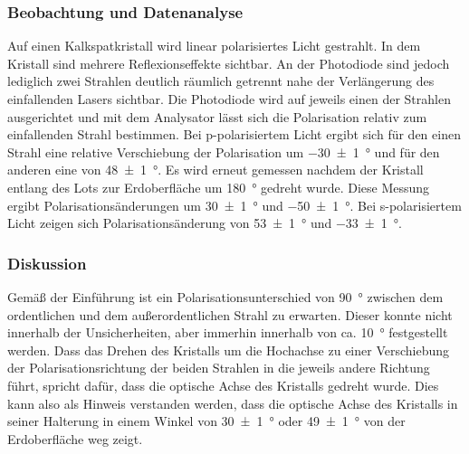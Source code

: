 \documentclass[
	a4paper,
	12pt,
	pagesize,
	ngerman
]{scrartcl}
\begin{document}
	\subsubsection{Beobachtung und Datenanalyse}
	Auf einen Kalkspatkristall wird linear polarisiertes Licht gestrahlt.
	In dem Kristall sind mehrere Reflexionseffekte sichtbar. 
	An der Photodiode sind jedoch lediglich zwei Strahlen deutlich räumlich getrennt nahe der Verlängerung des einfallenden Lasers sichtbar.
	Die Photodiode wird auf jeweils einen der Strahlen ausgerichtet und mit dem Analysator lässt sich die Polarisation relativ zum einfallenden Strahl bestimmen.
	Bei p-polarisiertem Licht ergibt sich für den einen Strahl eine relative Verschiebung der Polarisation um \SI{-30+-1}{\degree} und für den anderen eine von \SI{48+-1}{\degree}.
	Es wird erneut gemessen nachdem der Kristall entlang des Lots zur Erdoberfläche um \SI{180}{\degree} gedreht wurde.
	Diese Messung ergibt Polarisationsänderungen um \SI{30+-1}{\degree} und \SI{-50+-1}{\degree}.
	Bei s-polarisiertem Licht zeigen sich Polarisationsänderung von \SI{53+-1}{\degree} und \SI{-33+-1}{\degree}.

	\subsubsection{Diskussion}
	Gemäß der Einführung ist ein Polarisationsunterschied von \SI{90}{\degree} zwischen dem ordentlichen und dem außerordentlichen Strahl zu erwarten.
	Dieser konnte nicht innerhalb der Unsicherheiten, aber immerhin innerhalb von ca. \SI{10}{\degree} festgestellt werden.
	Dass das Drehen des Kristalls um die Hochachse zu einer Verschiebung der Polarisationsrichtung der beiden Strahlen in die jeweils andere Richtung führt, spricht dafür, dass die optische Achse des Kristalls gedreht wurde.
	Dies kann also als Hinweis verstanden werden, dass die optische Achse des Kristalls in seiner Halterung in einem Winkel von \SI{30+-1}{\degree} oder \SI{49+-1}{\degree} von der Erdoberfläche weg zeigt.
	
	
\end{document}
